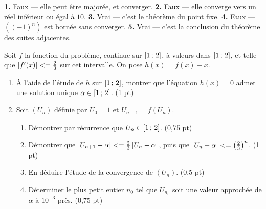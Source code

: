 \begin{corrige}[je me teste]
\textbf{1.} Faux — elle peut être majorée, et converger.
\textbf{2.} Faux — elle converge vers un réel inférieur ou égal à $10$.
\textbf{3.} Vrai — c'est le théorème du point fixe.
\textbf{4.} Faux — $\left((-1)^{n}\right)$ est bornée sans converger.
\textbf{5.} Vrai — c'est la conclusion du théorème des suites adjacentes.
\end{corrige}

\begin{commeaubac}
Soit $f$ la fonction du problème, continue sur $\left[1\,;\,2\right]$, à valeurs
dans $\left[1\,;\,2\right]$, et telle que $\left|f'(x)\right| <= \frac23$ sur cet
intervalle. On pose $h(x) = f(x)-x$.

\begin{enumerate}[label=\textbf{\arabic*.}, leftmargin=*, itemsep=0.25em]
  \item À l'aide de l'étude de $h$ sur $\left[1\,;\,2\right]$, montrer que
        l'équation $h(x) = 0$ admet une solution unique
        $\alpha \in \left[1\,;\,2\right]$. \hfill\textup{(1 pt)}
  \item Soit $(U_{n})$ définie par $U_{0} = 1$ et $U_{n+1} = f(U_{n})$.
        \begin{enumerate}[label=\textbf{\alph*)}, leftmargin=1.4em]
          \item Démontrer par récurrence que $U_{n} \in \left[1\,;\,2\right]$.
                \hfill\textup{(0,75 pt)}
          \item Démontrer que
                $\left|U_{n+1}-\alpha\right| <= \frac23\left|U_{n}-\alpha\right|$, puis
                que $\left|U_{n}-\alpha\right| <= \left(\frac23\right)^{n}$.
                \hfill\textup{(1 pt)}
          \item En déduire l'étude de la convergence de $(U_{n})$.
                \hfill\textup{(0,5 pt)}
          \item Déterminer le plus petit entier $n_{0}$ tel que $U_{n_{0}}$
                soit une valeur approchée de $\alpha$ à $10^{-3}$ près.
                \hfill\textup{(0,75 pt)}
        \end{enumerate}
\end{enumerate}
\end{commeaubac}

